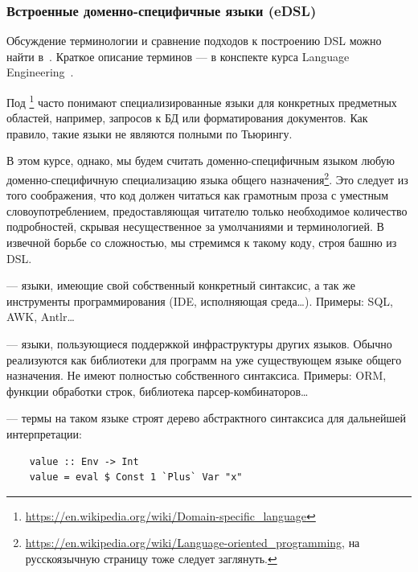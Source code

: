 \subsubsection{Встроенные доменно-специфичные языки (eDSL)} \label{subsubsec:edsl}

Обсуждение терминологии и сравнение подходов к построению DSL можно найти в~\cite{gibbons2013functional}.
Краткое описание терминов --- в конспекте курса Language Engineering~\cite{languageEngineering}.

Под \footnote{\url{https://en.wikipedia.org/wiki/Domain-specific_language}} часто понимают специализированные языки для конкретных предметных областей, например, запросов к БД или форматирования документов.
Как правило, такие языки не являются полными по Тьюрингу.

В этом курсе, однако, мы будем считать доменно-специфичным языком любую доменно-специфичную специализацию языка общего назначения\footnote{\url{https://en.wikipedia.org/wiki/Language-oriented_programming}, на русскоязычную страницу тоже следует заглянуть.}.
Это следует из того соображения, что код должен читаться как грамотным проза с уместным словоупотреблением, предоставляющая читателю только необходимое количество подробностей, скрывая несущественное за умолчаниями и терминологией.
В извечной борьбе со сложностью, мы стремимся к такому коду, строя башню из DSL\@.

 --- языки, имеющие свой собственный конкретный синтаксис, а так же инструменты программирования (IDE, исполняющая среда\ldots).
Примеры: SQL, AWK, Antlr\ldots

 --- языки, пользующиеся поддержкой инфраструктуры других языков.
Обычно реализуются как библиотеки для программ на уже существующем языке общего назначения.
Не имеют полностью собственного синтаксиса.
Примеры: ORM, функции обработки строк, библиотека парсер-комбинаторов\ldots

 --- термы на таком языке строят дерево абстрактного синтаксиса для дальнейшей интерпретации:
\begin{verbatim}
    value :: Env -> Int
    value = eval $ Const 1 `Plus` Var "x"
\end{verbatim}

